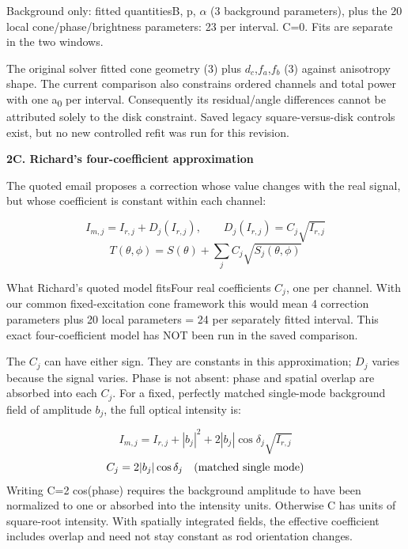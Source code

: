 \documentclass[10pt,a4paper]{article}
\newcommand{\heading}[1]{{\sffamily\Large\bfseries\color{ink}#1}\par\vspace{7pt}}
\begin{document}
\begin{fitbox}{Background only: fitted quantities}B, p, \(α\) (3 background parameters), plus the 20 local cone/phase/brightness parameters: 23 per interval. C=0. Fits are separate in the two windows.\end{fitbox}
The original solver fitted cone geometry (3) plus \(d_{c}\),\(f_{a}\),\(f_{b}\) (3) against anisotropy shape. The current comparison also constrains ordered channels and total power with one a\textsubscript{0} per interval. Consequently its residual/angle differences cannot be attributed solely to the disk constraint. Saved legacy square-versus-disk controls exist, but no new controlled refit was run for this revision.\par
\clearpage
\heading{2C. Richard’s four-coefficient approximation}
The quoted email proposes a correction whose value changes with the real signal, but whose coefficient is constant within each channel:\par
\begin{equation*}I_{m,j}=I_{r,j}+D_j(I_{r,j}),\qquad D_j(I_{r,j})=C_j\sqrt{I_{r,j}}\end{equation*}
\begin{equation*}T(\theta,\phi)=S(\theta)+\sum_j C_j\sqrt{S_j(\theta,\phi)}\end{equation*}
\begin{fitbox}{What Richard’s quoted model fits}Four real coefficients \(C_{j}\), one per channel. With our common fixed-excitation cone framework this would mean 4 correction parameters plus 20 local parameters = 24 per separately fitted interval. This exact four-coefficient model has NOT been run in the saved comparison.\end{fitbox}
The \(C_{j}\) can have either sign. They are constants in this approximation; \(D_{j}\) varies because the signal varies. Phase is not absent: phase and spatial overlap are absorbed into each \(C_{j}\). For a fixed, perfectly matched single-mode background field of amplitude \(b_{j}\), the full optical intensity is:\par
\begin{equation*}I_{m,j}=I_{r,j}+|b_j|^2+2|b_j|\cos\delta_j\sqrt{I_{r,j}}\end{equation*}
\begin{equation*}C_j=2|b_j|\cos\delta_j\quad\hbox{(matched single mode)}\end{equation*}
Writing C=2 cos(phase) requires the background amplitude to have been normalized to one or absorbed into the intensity units. Otherwise C has units of square-root intensity. With spatially integrated fields, the effective coefficient includes overlap and need not stay constant as rod orientation changes.\par
\end{document}
